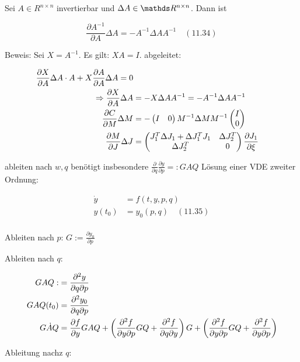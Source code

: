 \eitm


Sei $A \in R^{n\times n}$ invertierbar und $\Delta A \in \R^{n\times n}$. Dann ist

\[ \frac{\partial A^{-1}}{\partial A} \Delta A = - A^{-1} \Delta A A^{-1} \quad (11.34) \]

Beweis: Sei $X = A^{-1}$. Es gilt: $XA = I$. abgeleitet:

\begin{align*}
\frac{\partial X}{\partial A} \Delta A \cdot A + X \frac{\partial A}{\partial A} \Delta A = 0 \\
\Rightarrow \frac{\partial X}{\partial A} \Delta A &= -X \Delta A A^{-1} = -A^{-1} \Delta A A^{-1} \\
\frac{\partial C}{\partial M} \Delta M &= - \begin{pmatrix} I & 0 \end{pmatrix} M^{-1} \Delta M M^{-1} \begin{pmatrix} I \\ 0 \end{pmatrix} \\
\frac{\partial M}{\partial J} \Delta J &= \begin{pmatrix} J_1^T \Delta J_1 + \Delta J_1^T J_1 & \Delta J_2^T \\ \Delta J_2^T & 0 \end{pmatrix} 
\frac{\partial J_1}{\partial \xi}
\end{align*}

ableiten nach $w,q$ benötigt insbesondere $\frac{\partial}{\partial q} \frac{\partial y}{\partial p} =: GAQ$ Lösung einer VDE zweiter Ordnung:

\begin{align*}
\dot y &= f(t,y,p,q) \\
y(t_0) &= y_0(p,q) \quad (11.35) \\
\end{align*}

Ableiten nach $p$: $G := \frac{\partial y_0}{\partial p}$

Ableiten nach $q$: 

\begin{align*}
GAQ :&= \frac{\partial^2 y}{\partial q \partial p} \\
GAQ(t_0) &= \frac{\partial^2 y_0}{\partial q \partial p} \\
G\dot A Q &= \frac{\partial f}{\partial y} GAQ + \left( \frac{\partial^2 f}{\partial y \partial p} GQ + \frac{\partial^2 f}{\partial q \partial y} \right) G + \left( \frac{\partial^2 f}{\partial y \partial p} GQ + \frac{\partial^2 f}{\partial y \partial p} \right) \\
\end{align*}

Ableitung nachz $q$:

